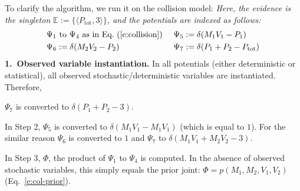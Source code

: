 \documentclass[]{article}
\newcommand{\tuple}[1] {\langle #1 \rangle}
\newcommand{\pr}{p}
\begin{document}

To clarify the algorithm, we run it on the collision model: 
\emph{Here, the evidence is the singleton {\footnotesize$\mathbb{E} := \{\tuple{P_\text{tot}, 3}\}$}, and 
the potentials are indexed as follows: 
\begin{align*}
& \Psi_1 \text{ to } \Psi_4 \text{ as in Eq.~(\ref{e:collision}) } &&\Psi_5 := \delta(M_1V_1 - P_1)\\
&\Psi_6 := \delta(M_2V_2 - P_2)		&& \Psi_7 := \delta(P_1 + P_2 - P_\text{tot})   
\end{align*}
}
{\bf 1.~Observed variable instantiation.} 
In all potentials (either deterministic or statistical), all observed stochastic/deterministic 
variables are instantiated. Therefore,

{\footnotesize$\Psi_{7}$} is converted to 
{\footnotesize$\delta(P_1 + P_2 - 3)$}. %

In Step 2, 
{\footnotesize$\Psi_5$} is converted to 
{\footnotesize$\delta(M_1 V_1 - M_1 V_1)$}
(which is equal to $1$). 
For the similar reason 
{\footnotesize$\Psi_6$} is converted to $1$ and 
{\footnotesize$\Psi_7$} to 
{\footnotesize$\delta(M_1 V_1 + M_2 V_2 - 3)$}.  

In Step 3, 
{\footnotesize$\Phi$}, the product of 
{\footnotesize$\Psi_1$} to 
{\footnotesize$\Psi_4$} is computed. In the absence of observed stochastic variables, this simply equals the prior joint: 
{\footnotesize$\Phi = \pr(M_1, M_2, V_1, V_2)$} (Eq.~\ref{e:col-prior}).
\end{document}
